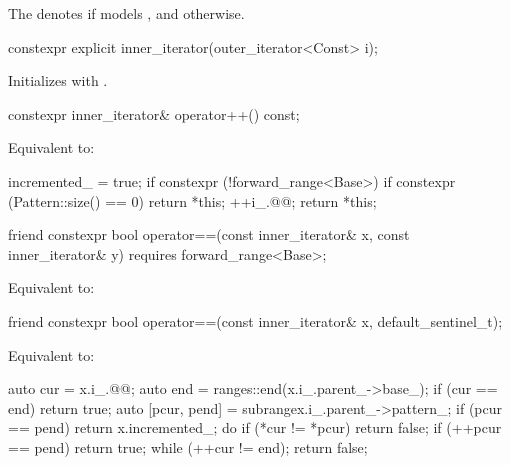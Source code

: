 \pnum
The   denotes
 if
 models
, and 
otherwise.

%
\begin{itemdecl}
constexpr explicit inner_iterator(outer_iterator<Const> i);
\end{itemdecl}

\begin{itemdescr}
\pnum
\effects
Initializes  with .
\end{itemdescr}

%
\begin{itemdecl}
constexpr inner_iterator& operator++() const;
\end{itemdecl}

\begin{itemdescr}
\pnum
\effects
Equivalent to:
\begin{codeblock}
incremented_ = true;
if constexpr (!forward_range<Base>) {
  if constexpr (Pattern::size() == 0) {
    return *this;
  }
}
++i_.@@;
return *this;
\end{codeblock}
\end{itemdescr}

%
\begin{itemdecl}
friend constexpr bool operator==(const inner_iterator& x, const inner_iterator& y)
  requires forward_range<Base>;
\end{itemdecl}

\begin{itemdescr}
\pnum
\effects
Equivalent to: 
\end{itemdescr}

%
\begin{itemdecl}
friend constexpr bool operator==(const inner_iterator& x, default_sentinel_t);
\end{itemdecl}

\begin{itemdescr}
\pnum
\effects
Equivalent to:
\begin{codeblock}
auto cur = x.i_.@@;
auto end = ranges::end(x.i_.parent_->base_);
if (cur == end) return true;
auto [pcur, pend] = subrange{x.i_.parent_->pattern_};
if (pcur == pend) return x.incremented_;
do {
  if (*cur != *pcur) return false;
  if (++pcur == pend) return true;
} while (++cur != end);
return false;
\end{codeblock}
\end{itemdescr}

